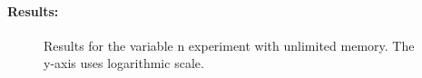 \documentclass[a4paper,10pt]{article}
\begin{document}

\paragraph{Results:}

\begin{figure}
\centering
{}
\caption{Results for the variable n experiment with unlimited memory. The y-axis uses logarithmic scale. \label{fig:variable-count-u}}
\end{figure}
\end{document}
